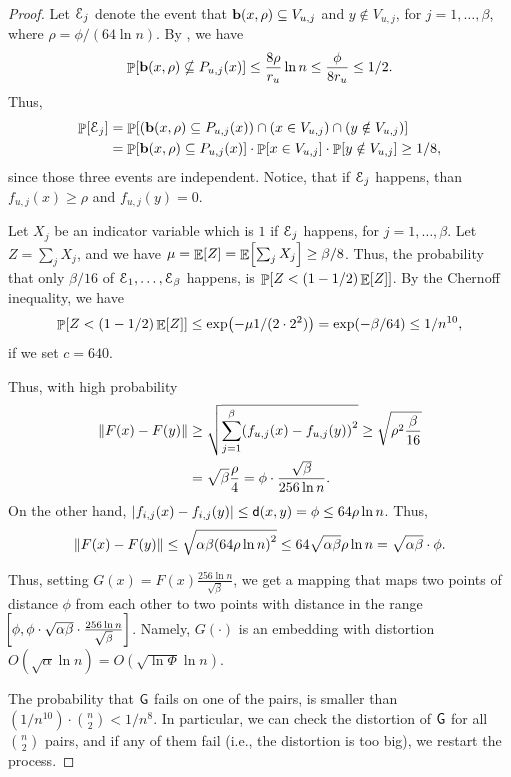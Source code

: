 \begin{proof}
    Let $\EuScript{E}_j$ denote the event that $\mathbf{b}(x,\rho) \subseteq
    V_{u,j}$ and $y \notin V_{u,j}$, for $j=1,\ldots, \beta$, where
    $\rho=\phi /(64 \ln n)$. By , we have
    \begin{equation*}
    \Prob{\Ball(x,\rho) \nsubseteq P_{u,j}(x) } \leq \frac{8\rho}{r_u}
    \ln n \leq \frac{\phi}{8r_u}
    \leq 1/2.
    \end{equation*}
    Thus, 
    \begin{align*}
      \Prob{\Event_j}%
      &=%
        \Prob{\pth{\Ball(x,\rho) \subseteq
        P_{u,j}(x) \MakeBig }
        \cap \pth{x \in V_{u,j}} \cap \pth{ y \notin V_{u,j}} }%
      \\&%
      =%
      \Prob{\Ball(x,\rho) \subseteq P_{u,j}(x) } \cdot 
      \Prob{ x \in V_{u,j}} \cdot
      \Prob{ y \notin V_{u,j} } \geq 1/8,
    \end{align*}
    since those three events are independent.  Notice, that if
    $\EuScript{E}_j$ happens, than $f_{u,j}(x) \geq \rho$ and
    $f_{u,j}(y)=0$.
    
    Let $X_j$ be an indicator variable which is $1$ if $\EuScript{E}_j$
    happens, for $j=1,\ldots,\beta$. Let $Z = \sum_j X_j$, and we have
    $\mu = \mathop{\mathbb{E}}\!\left[ {Z } \right] = \mathop{\mathbb{E}}\!\left[ { \sum_j X_j} \right] \geq \beta/8$. Thus, the
    probability that only $\beta/16$ of
    $\EuScript{E}_1, \ldots, \EuScript{E}_\beta$ happens, is
    $\Prob{Z < (1-1/2)\Ex{Z}}$. By the Chernoff inequality, we have
    \[
    \Prob{Z < (1-1/2)\Ex{Z}} \leq \exp \pth{ - \mu 1/(2\cdot 2^2)} =
    \exp \pth{ -\beta/64} \leq 1/n^{10},
    \]
    if we set $c=640$.
    
    Thus, with high probability
    \begin{align*}
    \dist{F(x) - F(y)} &\geq \sqrt{\sum_{j=1}^{\beta} \pth{f_{u,j}(x) -
          f_{u,j}(y)}^2 }\geq \sqrt{ \rho^2 \frac{\beta}{16}}
    \\&= 
    \sqrt{\beta} \frac{\rho}{4} = \phi \cdot \frac{\sqrt{\beta}}{256
          \ln n}.
    \end{align*}    
    On the other hand, $\left| {f_{i,j}(x) - f_{i,j}(y)} \right| \leq
    \mathsf{d}(x,y) = \phi \leq 64 \rho \ln n$. Thus,
    \begin{equation*}
    \dist{F(x) - F(y)} \leq \sqrt{\alpha \beta \pth{64 \rho \ln n}^2 } 
    \leq 64 \sqrt{\alpha \beta} \rho \ln n = \sqrt{\alpha \beta} \cdot
    \phi.
    \end{equation*}
    
    Thus, setting $G(x) = F(x) \frac{256 \ln n}{\sqrt{\beta}}$, we get
    a mapping that maps two points of distance $\phi$ from each other
    to two points with distance in the range $\!\!\left[ {\phi , \phi \cdot
       \sqrt{\alpha \beta} \cdot \frac{256 \ln n}{\sqrt{\beta}} 
    } \bigr. \right]$. Namely, $G(\cdot)$ is an embedding with distortion $O(
    \sqrt{\alpha} \ln n) = O( \sqrt{\ln \Phi} \ln n)$.

    The probability that $\mathsf{G}$ fails on one of the pairs, is
    smaller than $(1/n^{10}) \cdot \binom{n}{2} < 1/n^{8}$. In
    particular, we can check the distortion of $\mathsf{G}$ for all
    $\binom{n}{2}$ pairs, and if any of them fail (i.e., the
    distortion is too big), we restart the process.
\end{proof}



